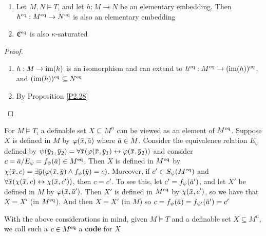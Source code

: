 \documentclass[11pt]{article}
\begin{document}

\begin{corollary}[]
\begin{enumerate}
\item Let \(M,N\vDash T\), and let \(h:M\to N\) be an elementary embedding.
Then \(h^{\operatorname{eq}}:M^{\operatorname{eq}}\to N^{\operatorname{eq}}\) is also an elementary embedding
\item \(\mathfrak{C}^{\operatorname{eq}}\) is also \(\kappa\)-saturated
\end{enumerate}
\end{corollary}

\begin{proof}
\begin{enumerate}
\item \(h:M\to\operatorname{im}(h)\) is an isomorphism and can extend to \(h^{\operatorname{eq}}:M^{\operatorname{eq}}\to(\operatorname{im}(h))^{\operatorname{eq}}\),
and \((\operatorname{im}(h))^{\operatorname{eq}}\subseteq N^{\operatorname{eq}}\)
\item By Proposition \ref{P2.28}
\end{enumerate}
\end{proof}

\begin{remark}
For \(M\vDash T\), a definable set \(X\subseteq M^n\) can be viewed as an element of \(M^{\operatorname{eq}}\).
Suppose \(X\) is defined in \(M\) by \(\varphi(\barx,\bara)\) where \(\bara\in M\). Consider the
equivalence relation \(E_\psi\) defined
by \(\psi(\bary_1,\bary_2)=\forall\barx(\varphi(\barx,\bary_1)\leftrightarrow\varphi(\barx,\bary_2))\)
and consider \(c=\bara/E_\psi=f_\psi(\bara)\in M^{\eq}\). Then \(X\) is defined in \(M^{\operatorname{eq}}\)
by \(\chi(\barx,c)=\exists\bary(\varphi(\barx,\bary)\wedge f_\psi(\bary)=c)\). Moreover, if \(c'\in S_\psi(M^{\operatorname{eq}})\)
and \(\forall\barx(\chi(\barx,c)\leftrightarrow\chi(\barx,c'))\), then \(c=c'\). To see this, let \(c'=f_{\psi}(\bara')\),
and let \(X'\) be defined in \(M\) by \(\varphi(\barx,\bara')\). Then \(X'\) is defined in \(M^{\operatorname{eq}}\)
by \(\chi(\barx,c')\), so we have that \(X=X'\) (in \(M^{\operatorname{eq}}\)). And then \(X=X'\) (in \(M\))
so \(c=f_{\psi}(\bara)=f_{\psi'}(\bara')=c'\)
\end{remark}

\begin{definition}[]
With the above considerations in mind, given \(M\vDash T\) and a definable set \(X\subseteq M^n\), we call
such a \(c\in M^{\operatorname{eq}}\) a \textbf{code} for \(X\)
\end{definition}
\end{document}
